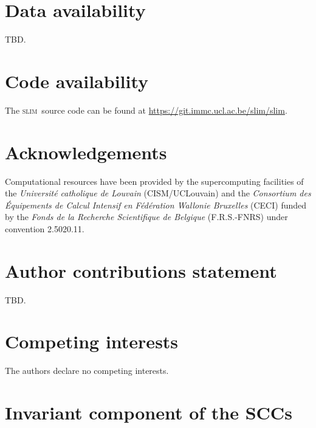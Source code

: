 \documentclass[preprint,12pt,authoryear]{elsarticle}
\newcommand{\slim}{\textsc{slim}\ }
\begin{document}

\section*{Data availability}

TBD.

\section*{Code availability}

The \slim source code can be found at \href{https://git.immc.ucl.ac.be/slim/slim}{https://git.immc.ucl.ac.be/slim/slim}.

\section*{Acknowledgements}

Computational resources have been provided by the supercomputing facilities of the \textit{Universit\'e catholique de Louvain} (CISM/UCLouvain) and the \textit{Consortium des \'Equipements de Calcul Intensif en F\'ed\'eration Wallonie Bruxelles} (CECI) funded by the \textit{Fonds de la Recherche Scientifique de Belgique} (F.R.S.-FNRS) under convention 2.5020.11.

\section*{Author contributions statement}

TBD.

\section*{Competing interests}

The authors declare no competing interests.




\newpage
\appendix

\section{Invariant component of the SCCs}
\end{document}
